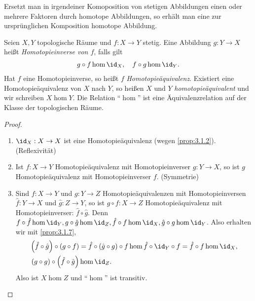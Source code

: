 \begin{cor}
\label{prop:3.1.7}
Ersetzt man in irgendeiner Komoposition von stetigen Abbildungen einen oder
mehrere Faktoren durch homotope Abbildungen, so erhält man eine zur
ursprünglichen Komposition homotope Abbildung.\fishhere
\end{cor}

\begin{lem}
\label{prop:3.1.8}
Seien $X,Y$ topologische Räume und $f: X\to Y$ stetig. Eine Abbildung $g: Y\to
X$ heißt \emph{Homotopieinverse von $f$}, falls gilt
\begin{align*}
g\circ f\hom \id_X,\quad
f\circ g\hom \id_Y.
\end{align*}
Hat $f$ eine Homotopieinverse, so heißt $f$ \emph{Homotopieäquivalenz}.
Existiert eine Homotopieäquivalenz von $X$ nach $Y$, so heißen $X$ und $Y$
\emph{homotopieäquivalent} und wir schreiben $X\hom Y$. Die Relation ``$\hom$''
ist eine Äquivalenzrelation auf der Klasse der topologischen Räume.\fishhere
\end{lem}
\begin{proof}
\begin{enumerate}
  \item $\id_X: X\to X$ ist eine Homotopieäquivalenz (wegen \ref{prop:3.1.2}).
  (Reflexivität)
  \item Ist $f: X\to Y$ Homotopieäquivalenz mit Homotopieinverser $g: Y\to X$,
  so ist $g$ Homotopieäquivalenz mit Homotopieinverser $f$. (Symmetrie)
  \item Sind $f: X\to Y$ und $g: Y\to Z$ Homotopieäquivalenzen mit
  Homotopieinversen $\hat{f}: Y\to X$ und $\hat{g}: Z\to Y$, so ist $g\circ f:
  X\to Z$ Homotopieäquivalenz mit Homotopieinverser: $\hat{f}\circ\hat{g}$.
  Denn $f\circ\hat{f} \hom \id_Y, g\circ\hat{g} \hom \id_Z, \hat{f}\circ f 
  \hom \id_X, \hat{g}\circ g\hom \id_Y$. Also erhalten wir mit \ref{prop:3.1.7},
  \begin{align*}
  \left(\hat{f}\circ\hat{g}\right)\circ\left(g\circ f\right)
  &= \hat{f}\circ\left(\hat{g}\circ g\right)\circ f
  \hom \hat{f}\circ\id_Y\circ f = \hat{f}\circ f \hom \id_X,\\
  \left(g\circ g\right)\circ \left(\hat{f}\circ\hat{g}\right) &\hom \id_Z.
  \end{align*}
Also ist $X\hom Z$ und ``$\hom$'' ist transitiv.\qedhere
\end{enumerate}
\end{proof}

